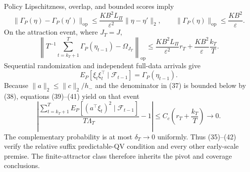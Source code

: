 Policy Lipschitzness, overlap, and bounded scores imply
\[
 \|\Gamma_P(\eta)-\Gamma_P(\eta')\|_{\mathrm{op}}
 \le\frac{KB^2L_\Pi}{\varepsilon^2}\|\eta-\eta'\|_2,
 \qquad \|\Gamma_P(\eta)\|_{\mathrm{op}}\le\frac{KB^2}{\varepsilon}.
\tag{39}
\]
On the attraction event, where \(J_T=J\),
\[
 \left\|T^{-1}\sum_{t=k_T+1}^T\Gamma_P(\eta_{t-1})-
 \Omega_{J_T}\right\|_{\mathrm{op}}
 \le\frac{KB^2L_\Pi}{\varepsilon^2}r_T
 +\frac{KB^2}{\varepsilon}\frac{k_T}{T}.
\tag{40}
\]
Sequential randomization and independent full-data arrivals give
\[
 E_P[\xi_t\xi_t^\top\mid\mathcal F_{t-1}]
 =\Gamma_P(\eta_{t-1}).
\tag{41}
\]
Because \(\|a\|_2\le\|c\|_2/h_-\) and the denominator in (37) is bounded
below by (38), equations (39)--(41) yield on that event
\[
 \left|
 \frac{\sum_{t=k_T+1}^TE_P[(a^\top\xi_t)^2\mid\mathcal F_{t-1}]}
 {T\Lambda_T}-1\right|
 \le C_c\left(r_T+\frac{k_T}{T}\right)\longrightarrow0.
\tag{42}
\]
The complementary probability is at most \(\delta_T\to0\) uniformly.
Thus (35)--(42) verify the relative suffix predictable-QV condition and
every other early-scale premise.  The finite-attractor class therefore
inherits the pivot and coverage conclusions.